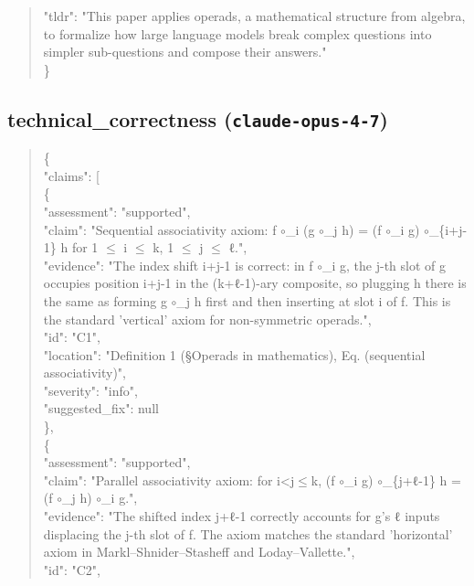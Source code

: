 \documentclass[11pt]{article}
\begin{document}
\begin{quote}
  "tldr": "This paper applies operads, a mathematical structure from algebra, to formalize how large language models break complex questions into simpler sub-questions and compose their answers."\\
\}\\
\end{quote}

\subsection*{technical\_correctness (\texttt{claude-opus-4-7})}
\begin{quote}\small\ttfamily\raggedright
\{\\
  "claims": [\\
    \{\\
      "assessment": "supported",\\
      "claim": "Sequential associativity axiom: f \ensuremath{\circ}\_i (g \ensuremath{\circ}\_j h) = (f \ensuremath{\circ}\_i g) \ensuremath{\circ}\_\{i+j-1\} h for 1 \ensuremath{\le} i \ensuremath{\le} k, 1 \ensuremath{\le} j \ensuremath{\le} ℓ.",\\
      "evidence": "The index shift i+j-1 is correct: in f \ensuremath{\circ}\_i g, the j-th slot of g occupies position i+j-1 in the (k+ℓ-1)-ary composite, so plugging h there is the same as forming g \ensuremath{\circ}\_j h first and then inserting at slot i of f. This is the standard 'vertical' axiom for non-symmetric operads.",\\
      "id": "C1",\\
      "location": "Definition 1 (§Operads in mathematics), Eq. (sequential associativity)",\\
      "severity": "info",\\
      "suggested\_fix": null\\
    \},\\
    \{\\
      "assessment": "supported",\\
      "claim": "Parallel associativity axiom: for i<j\ensuremath{\le}k, (f \ensuremath{\circ}\_i g) \ensuremath{\circ}\_\{j+ℓ-1\} h = (f \ensuremath{\circ}\_j h) \ensuremath{\circ}\_i g.",\\
      "evidence": "The shifted index j+ℓ-1 correctly accounts for g's ℓ inputs displacing the j-th slot of f. The axiom matches the standard 'horizontal' axiom in Markl--Shnider--Stasheff and Loday--Vallette.",\\
      "id": "C2",\\

\end{quote}
\end{document}
